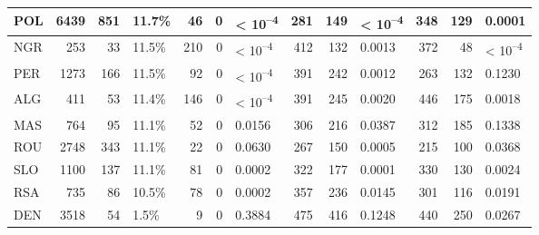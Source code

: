 \begin{tabular}{l|r|r|l|r|r|l|r|r|l|r|r|l}
\hline
POL & 6439 & 851 & 11.7\% & 46 & 0 & < 10\textsuperscript{--4} & 281 & 149 & < 10\textsuperscript{--4} & 348 & 129 & 0.0001\\
\hline
NGR & 253 & 33 & 11.5\% & 210 & 0 & < 10\textsuperscript{--4} & 412 & 132 & 0.0013 & 372 & 48 & < 10\textsuperscript{--4}\\
\hline
PER & 1273 & 166 & 11.5\% & 92 & 0 & < 10\textsuperscript{--4} & 391 & 242 & 0.0012 & 263 & 132 & 0.1230\\
\hline
ALG & 411 & 53 & 11.4\% & 146 & 0 & < 10\textsuperscript{--4} & 391 & 245 & 0.0020 & 446 & 175 & 0.0018\\
\hline
MAS & 764 & 95 & 11.1\% & 52 & 0 & 0.0156 & 306 & 216 & 0.0387 & 312 & 185 & 0.1338\\
\hline
ROU & 2748 & 343 & 11.1\% & 22 & 0 & 0.0630 & 267 & 150 & 0.0005 & 215 & 100 & 0.0368\\
\hline
SLO & 1100 & 137 & 11.1\% & 81 & 0 & 0.0002 & 322 & 177 & 0.0001 & 330 & 130 & 0.0024\\
\hline
RSA & 735 & 86 & 10.5\% & 78 & 0 & 0.0002 & 357 & 236 & 0.0145 & 301 & 116 & 0.0191\\
\hline
DEN & 3518 & 54 & 1.5\% & 9 & 0 & 0.3884 & 475 & 416 & 0.1248 & 440 & 250 & 0.0267\\
\hline
\end{tabular}
